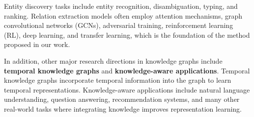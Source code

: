 Entity discovery tasks include entity recognition, disambiguation, typing, and ranking. Relation extraction models often employ attention mechanisms, graph convolutional networks (GCNs), adversarial training, reinforcement learning (RL), deep learning, and transfer learning, which is the foundation of the method proposed in our work.

In addition, other major research directions in knowledge graphs include \textbf{temporal knowledge graphs} and \textbf{knowledge-aware applications}. Temporal knowledge graphs incorporate temporal information into the graph to learn temporal representations. Knowledge-aware applications include natural language understanding, question answering, recommendation systems, and many other real-world tasks where integrating knowledge improves representation learning.
